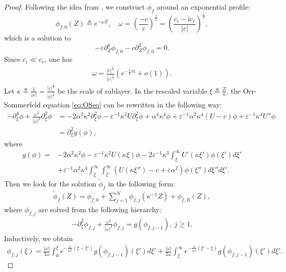 \documentclass[reqno,11pt]{amsart}
\numberwithin{equation}{section}
\numberwithin{equation}{section}
\theoremstyle{plain}
\begin{document}
\begin{proof}

 Following the idea from \cite{GMM-duke}, we construct $\phi_f$ around an exponential profile:  $$\phi_{f,0}(Z)\triangleq e^{-\omega Z},\quad\omega=\left(\frac{-c}{\varepsilon}\right)^{\frac12}=\left(\frac{c_i-\mathrm{i}c_r}{|\varepsilon|}\right)^{\frac12},$$
which is a solution to $$-\varepsilon\partial_Z^4\phi_{f,0}-c\partial_Z^2\phi_{f,0}=0.$$
Since $c_i\ll c_r$, one has
\begin{align}
	\omega=\frac{|c|^{\frac12}}{|\varepsilon|^{\frac12}}\left(e^{-\frac{1}{4}\pi \mathrm{i}}+o(1)\right).\nonumber
\end{align}
Let $\kappa\triangleq\frac{1}{|\omega|}=\frac{|\varepsilon|^{\frac12}}{|c|^{\frac12}}$ be the scale of sublayer. In the rescaled variable $\xi\triangleq \frac{Z}{\kappa}$, the Orr-Sommerfeld equation \eqref{eq:OSeq} can be rewritten in the following way:
\begin{align}
	-\partial_\xi^4\phi+\frac{\omega^2}{|\omega|^2}\partial_{\xi}^2\phi&=
	-2\alpha^2\kappa^2\partial_\xi^2\phi-\varepsilon^{-1}\kappa^{2}U\partial_\xi^2\phi+\alpha^4\kappa^4\phi+\varepsilon^{-1}\alpha^2\kappa^4(U-c)\phi+\varepsilon^{-1}\kappa^4U''\phi\nonumber\\
	&=\partial_\xi^2g(\phi),\nonumber
\end{align}
where
$$
\begin{aligned}
g(\phi)=&-2\alpha^2 \kappa^2\phi-\varepsilon^{-1}\kappa^2U(\kappa\xi)\phi-2\varepsilon^{-1}\kappa^3\int_\xi^\infty U'(\kappa\xi')\phi(\xi')d \xi'\nonumber\\
&+\varepsilon^{-1}\alpha^2\kappa^4\int_\xi^\infty\int_{\xi'}^\infty (U(\kappa\xi'')-c+\varepsilon \alpha^2)\phi(\xi'')d \xi''d\xi'.
\end{aligned}
$$
Then we look for the solution $\tilde{\phi}_{f}$ in the following form:
\begin{align}
	\tilde{\phi}_f(Z)=\phi_{f,0}+\sum_{j=1}^N\phi_{f,j}(\kappa^{-1}Z)+\phi_{f,R}(Z), \label{phit}
\end{align}
where $\phi_{f,j}$ are solved from the following hierarchy:
\begin{align}
	-\partial_\xi^2\phi_{f,j}+\frac{\omega^2}{|\omega|^2}\phi_{f,j}=g(\phi_{f,j-1}),~j\geq 1.\nonumber
\end{align}
Inductively, we obtain
\begin{align}
	\phi_{f,j}(\xi)=\frac{|\omega|}{2\omega}\int_0^\xi e^{-\frac{\omega}{|\omega|}(\xi-\xi')}g(\phi_{f,j-1})(\xi')d\xi'+\frac{|\omega|}{2\omega}\int_{\xi}^\infty e^{-\frac{\omega}{|\omega|}(\xi'-\xi)}g(\phi_{f,j-1})(\xi')d\xi'.\label{phij}

\end{align}
\end{proof}
\end{document}
